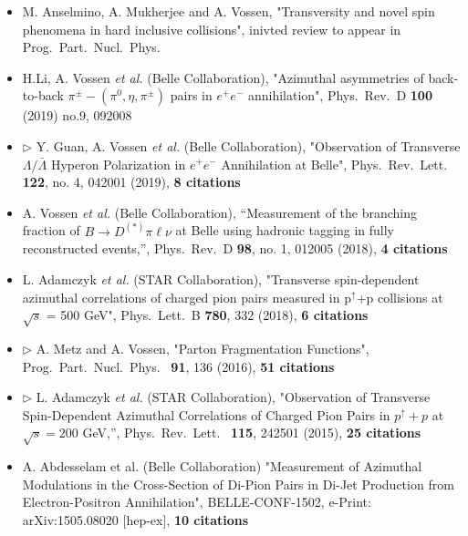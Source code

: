 \documentclass[11pt,letterpaper,sans]{moderncv} %
\begin{document}
  \begin{itemize}

\item M. Anselmino, A. Mukherjee and A. Vossen, "Transversity and novel spin phenomena in hard inclusive collisions", inivted review to appear in Prog.\ Part.\ Nucl.\ Phys.
\item H.Li, A. Vossen \textit{   et al.} (Belle Collaboration), "Azimuthal asymmetries of back-to-back $\pi^\pm-(\pi^0,\eta,\pi^\pm)$ pairs in $e^+e^-$ annihilation", Phys.\ Rev.\ D \textbf{100} (2019) no.9, 092008
    \item $\rhd$ Y. Guan, A. Vossen \textit{   et al.} (Belle Collaboration), "Observation of Transverse $\Lambda/\bar{\Lambda}$ Hyperon Polarization in $e^+e^-$
 Annihilation at Belle", Phys.\ Rev.\ Lett.\  \textbf{ 122}, no. 4, 042001 (2019), \textbf{8 citations}
 \item A. Vossen \textit{   et al.} (Belle Collaboration), ``Measurement of the branching fraction of $B \rightarrow D^{(*)}\pi \ell\nu$ at Belle using hadronic tagging in fully reconstructed events,'', Phys.\ Rev.\ D \textbf{ 98}, no. 1, 012005 (2018), \textbf{4 citations}
  \item L. Adamczyk \textit{   et al.} (STAR Collaboration), "Transverse spin-dependent azimuthal correlations of charged pion pairs measured in p$^\uparrow$+p collisions at $\sqrt{s}$ = 500 GeV", Phys.\ Lett.\ B \textbf{ 780}, 332 (2018), \textbf{6 citations} 
    \item $\rhd$ A. Metz and A. Vossen, "Parton Fragmentation Functions", Prog.\ Part.\ Nucl.\ Phys.\  \textbf{ 91}, 136 (2016), \textbf{51 citations}
    \item $\rhd$ L. Adamczyk \textit{   et al.} (STAR Collaboration), "Observation of Transverse Spin-Dependent Azimuthal Correlations of Charged Pion Pairs in $p^\uparrow+p$ at $\sqrt{s}=200$ GeV,'', Phys.\ Rev.\ Lett.\  \textbf{ 115}, 242501 (2015), \textbf{25 citations}
\item A. Abdesselam et al. (Belle Collaboration) "Measurement of Azimuthal Modulations in the Cross-Section of Di-Pion Pairs in Di-Jet Production from Electron-Positron Annihilation", BELLE-CONF-1502, e-Print: arXiv:1505.08020 [hep-ex], \textbf{10 citations}

\end{itemize}
\end{document}
